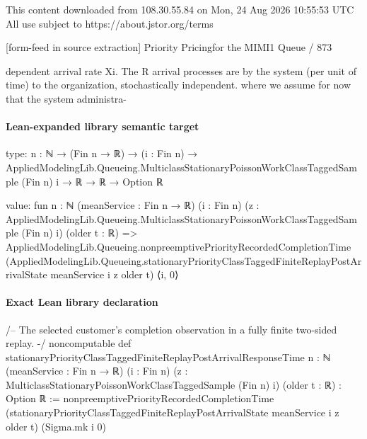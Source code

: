 \documentclass[10pt]{article}
\begin{document}
\begin{ReviewVerbatim}
                                                 This content downloaded from
                               108.30.55.84 on Mon, 24 Aug 2026 10:55:53 UTC
                                         All use subject to https://about.jstor.org/terms

[form-feed in source extraction]
                                                                                Priority Pricingfor the MIMI1 Queue / 873

dependent arrival rate Xi. The R arrival processes are                 by the system (per unit of time) to the organization,
stochastically independent.                                            where we assume for now that the system administra-
\end{ReviewVerbatim}



\paragraph{Lean-expanded library semantic target}
\begin{ReviewVerbatim}
type:
{n : ℕ} →
  (Fin n → ℝ) →
    (i : Fin n) →
      AppliedModelingLib.Queueing.MulticlassStationaryPoissonWorkClassTaggedSample (Fin n) i → ℝ → ℝ → Option ℝ

value:
fun {n : ℕ} (meanService : Fin n → ℝ) (i : Fin n)
    (z : AppliedModelingLib.Queueing.MulticlassStationaryPoissonWorkClassTaggedSample (Fin n) i) (older t : ℝ) =>
  AppliedModelingLib.Queueing.nonpreemptivePriorityRecordedCompletionTime
    (AppliedModelingLib.Queueing.stationaryPriorityClassTaggedFiniteReplayPostArrivalState meanService i z older t)
    ⟨i, 0⟩
\end{ReviewVerbatim}

\paragraph{Exact Lean library declaration}
\begin{ReviewVerbatim}
/-- The selected customer's completion observation in a fully finite
two-sided replay. -/
noncomputable def stationaryPriorityClassTaggedFiniteReplayPostArrivalResponseTime
    {n : ℕ} (meanService : Fin n → ℝ) (i : Fin n)
    (z : MulticlassStationaryPoissonWorkClassTaggedSample (Fin n) i)
    (older t : ℝ) : Option ℝ :=
  nonpreemptivePriorityRecordedCompletionTime
    (stationaryPriorityClassTaggedFiniteReplayPostArrivalState meanService i z older t)
    (Sigma.mk i 0)
\end{ReviewVerbatim}
\end{document}
